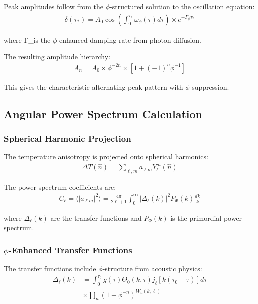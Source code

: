 Peak amplitudes follow from the $\phi$-structured solution to the oscillation equation:
\begin{align}
\delta(\tau_*) = A_0 \cos\left(\int_0^{\tau_*} \omega_\phi(\tau) d\tau\right) \times e^{-\Gamma_\phi \tau_*}
\end{align}

where Γ_\phi is the $\phi$-enhanced damping rate from photon diffusion.

The resulting amplitude hierarchy:
\begin{align}
A_n = A_0 \times \phi^{-2n} \times \left[1 + (-1)^n \phi^{-1}\right]
\end{align}

This gives the characteristic alternating peak pattern with $\phi$-suppression.

\subsection{Angular Power Spectrum Calculation}

\subsubsection{Spherical Harmonic Projection}

The temperature anisotropy is projected onto spherical harmonics:
\begin{align}
\Delta T(\hat{n}) = \sum_{\ell,m} a_{\ell m} Y_\ell^m(\hat{n})
\end{align}

The power spectrum coefficients are:
\begin{align}
C_\ell = \langle |a_{\ell m}|^2 \rangle = \frac{4\pi}{2\ell+1} \int_0^{\infty} |\Delta_\ell(k)|^2 P_{\Phi}(k) \frac{dk}{k}
\end{align}

where $\Delta_{\ell}(k)$ are the transfer functions and $P_{\Phi}(k)$ is the primordial power spectrum.

\subsubsection{$\phi$-Enhanced Transfer Functions}

The transfer functions include $\phi$-structure from acoustic physics:
\begin{align}
\Delta_\ell(k) &= \int_0^{\tau_0} g(\tau) \Theta_0(k,\tau) j_\ell[k(\tau_0-\tau)] d\tau \\
&\times \prod_{n} \left(1 + \phi^{-n}\right)^{W_n(k,\ell)}
\end{align}

